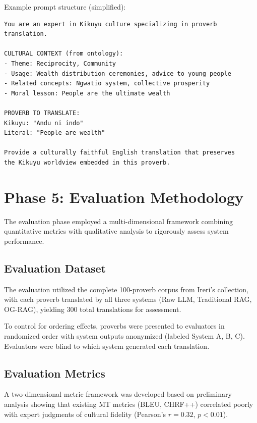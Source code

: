 Example prompt structure (simplified):

\begin{verbatim}
You are an expert in Kikuyu culture specializing in proverb translation.

CULTURAL CONTEXT (from ontology):
- Theme: Reciprocity, Community
- Usage: Wealth distribution ceremonies, advice to young people
- Related concepts: Ngwatio system, collective prosperity
- Moral lesson: People are the ultimate wealth

PROVERB TO TRANSLATE:
Kikuyu: "Andu ni indo"
Literal: "People are wealth"

Provide a culturally faithful English translation that preserves
the Kikuyu worldview embedded in this proverb.
\end{verbatim}

\section{Phase 5: Evaluation Methodology}
\label{sec:phase_evaluation}

The evaluation phase employed a multi-dimensional framework combining quantitative metrics with qualitative analysis to rigorously assess system performance.

\subsection{Evaluation Dataset}
\label{subsec:eval_dataset}

The evaluation utilized the complete 100-proverb corpus from Ireri's collection, with each proverb translated by all three systems (Raw LLM, Traditional RAG, OG-RAG), yielding 300 total translations for assessment.

To control for ordering effects, proverbs were presented to evaluators in randomized order with system outputs anonymized (labeled System A, B, C). Evaluators were blind to which system generated each translation.

\subsection{Evaluation Metrics}
\label{subsec:eval_metrics}

A two-dimensional metric framework was developed based on preliminary analysis showing that existing MT metrics (BLEU, CHRF++) correlated poorly with expert judgments of cultural fidelity (Pearson's $r = 0.32$, $p < 0.01$).

